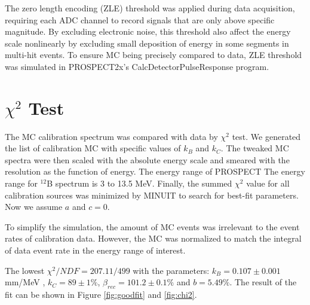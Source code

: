 The zero length encoding (ZLE) threshold was applied during data acquisition, requiring each ADC channel to record signals that are only above specific magnitude. 
By excluding electronic noise, this threshold also affect the energy scale nonlinearly by excluding small deposition of energy in some segments in multi-hit events. 
To ensure MC being precisely compared to data, ZLE threshold was simulated in PROSPECT2x's CalcDetectorPulseResponse program.

\section{$\chi^2$ Test}
The MC calibration spectrum was compared with data by $\chi^2$ test. We generated the list of calibration MC with specific values of $k_B$ and $k_C$. The tweaked MC spectra were then scaled with the absolute energy scale and smeared with the resolution as the function of energy. The energy range of PROSPECT The energy range for $^{12}$B spectrum is 3 to 13.5 MeV. Finally, the summed $\chi^2$ value for all calibration sources was minimized by MINUIT to search for best-fit parameters. Now we assume $a$ and $c = 0$. 

To simplify the simulation, the amount of MC events was irrelevant to the event rates of calibration data. However, the MC was normalized to match the integral of data event rate in the energy range of interest. 

The lowest $\chi^2/NDF = 207.11/499$ with the parameters: $k_B = 0.107 \pm 0.001$ mm/MeV , $k_C = 89 \pm 1\%$, $\beta_{rec} = 101.2 \pm 0.1\%$ and $b = 5.49\%$. The result of the fit can be shown in Figure \ref{fig:goodfit} and \ref{fig:chi2}.

